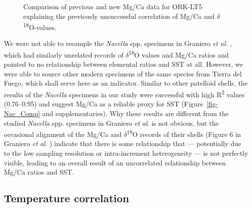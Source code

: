 \documentclass[
  authoryear,
  preprint,
  3p]{elsarticle}
\begin{document}
\begin{figure}


\caption{\label{fig-ORK_sub}Comparison of previous and new Mg/Ca data
for ORK-LT5 explaining the previously unsuccessful correlation of Mg/Ca
and \(\delta\)\textsuperscript{18}O-values.}

\end{figure}%

We were not able to resample the \emph{Nacella} spp. specimens in
Graniero \emph{et al.} \citeyearpar{Graniero2017-io}, which had
similarly unrelated records of \(\delta\)\textsuperscript{18}O values
and Mg/Ca ratios and pointed to no relationship between elemental ratios
and SST at all. However, we were able to source other modern specimens
of the same species from Tierra del Fuego, which shall serve here as an
indicator. Similar to other patelloid shells, the results of the
\emph{Nacella} specimens in our study were successful with high
R\textsuperscript{2} values (0.76--0.95) and suggest Mg/Ca as a reliable
proxy for SST (Figure~\ref{fig-Nac_Comp} and supplementaries). Why these
results are different from the studied \emph{Nacella} spp. specimens in
Graniero \emph{et al}. \citeyearpar{Graniero2017-io} is not obvious, but
the occasional alignment of the Mg/Ca and
\(\delta\)\textsuperscript{18}O records of their shells (Figure 6 in
Graniero \emph{et al}. \citeyearpar{Graniero2017-io}) indicate that
there is some relationship that --- potentially due to the low sampling
resolution or intra-increment heterogeneity --- is not perfectly
visible, leading to an overall result of an uncorrelated relationship
between Mg/Ca ratios and SST.

\subsection{Temperature correlation}\label{temperature-correlation}
\end{document}
